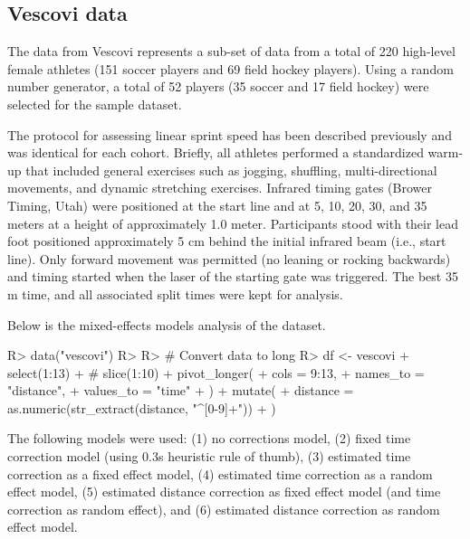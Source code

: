 \documentclass[
]{jss}
\begin{document}
\hypertarget{vescovi-data}{%
\subsection{Vescovi data}\label{vescovi-data}}

The data from Vescovi represents a sub-set of data from a total of 220 high-level female athletes (151 soccer players and 69 field hockey players). Using a random number generator, a total of 52 players (35 soccer and 17 field hockey) were selected for the sample dataset.

The protocol for assessing linear sprint speed has been described previously \citep{vescoviImpactMaximumSpeed2014, vescoviLocomotorHeartRateMetabolic2016, vescoviSprintSpeedCharacteristics2012} and was identical for each cohort. Briefly, all athletes performed a standardized warm-up that included general exercises such as jogging, shuffling, multi-directional movements, and dynamic stretching exercises. Infrared timing gates (Brower Timing, Utah) were positioned at the start line and at 5, 10, 20, 30, and 35 meters at a height of approximately 1.0 meter. Participants stood with their lead foot positioned approximately 5 cm behind the initial infrared beam (i.e., start line). Only forward movement was permitted (no leaning or rocking backwards) and timing started when the laser of the starting gate was triggered. The best 35 m time, and all associated split times were kept for analysis.

Below is the mixed-effects models analysis of the dataset.

\begin{CodeChunk}
\begin{CodeInput}
R> data("vescovi")
R> 
R> # Convert data to long
R> df <- vescovi %
+   select(1:13) %
+   # slice(1:10) %
+   pivot_longer(
+     cols = 9:13,
+     names_to = "distance",
+     values_to = "time"
+   ) %
+   mutate(
+     distance = as.numeric(str_extract(distance, "^[0-9]+"))
+   )
\end{CodeInput}
\end{CodeChunk}

The following models were used: (1) no corrections model, (2) fixed time correction model (using 0.3s heuristic rule of thumb), (3) estimated time correction as a fixed effect model, (4) estimated time correction as a random effect model, (5) estimated distance correction as fixed effect model (and time correction as random effect), and (6) estimated distance correction as random effect model.
\end{document}
